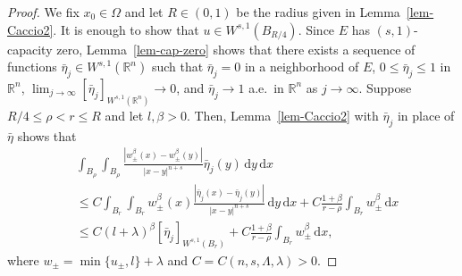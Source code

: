 \documentclass{amsart}
\theoremstyle{plain}
\theoremstyle{definition}
\numberwithin{equation}{section}
\begin{document}
\begin{proof}
We fix $x_0 \in \Omega$ and let $R \in (0,1)$ be the radius given in Lemma~\ref{lem-Caccio2}. It is enough to show that $u \in W^{s, 1}(B_{R/4})$. Since $E$ has $(s, 1)$-capacity zero, Lemma~\ref{lem-cap-zero} shows that there exists a sequence of functions $\bar{\eta}_j \in W^{s, 1}(\mathbb{R}^n)$ such that $\bar{\eta}_j=0$ in a neighborhood of $E$, $0 \leq \bar{\eta}_j \leq 1$ in $\mathbb{R}^n$, $\lim_{j\to \infty} [\bar{\eta}_j]_{W^{s,1}(\mathbb{R}^n)} \to 0$, and $\bar{\eta}_j \to 1$ a.e.\ in $\mathbb{R}^n$ as $j \to \infty$. Suppose $R/4\leq \rho<r\leq R$ and let $l, \beta>0$. Then, Lemma~\ref{lem-Caccio2} with $\bar{\eta}_j$ in place of $\bar{\eta}$ shows that
\begin{equation*}
\begin{split}
&\int_{B_\rho} \int_{B_\rho} \frac{|w_\pm^\beta(x)-w_\pm^\beta(y)|}{|x-y|^{n+s}} \bar{\eta}_j(y) \,\mathrm{d}y \,\mathrm{d}x \\
&\leq C \int_{B_r} \int_{B_r} w_\pm^\beta(x) \frac{|\bar{\eta}_j(x)-\bar{\eta}_j(y)|}{|x-y|^{n+s}} \,\mathrm{d}y\,\mathrm{d}x + C\frac{1+\beta}{r-\rho} \int_{B_r} w_\pm^\beta \,\mathrm{d}x \\
&\leq C (l+\lambda)^\beta [\bar{\eta}_j]_{W^{s, 1}(B_r)} + C \frac{1+\beta}{r-\rho} \int_{B_r} w_\pm^\beta \,\mathrm{d}x,
\end{split}
\end{equation*}
where $w_\pm=\min\{u_\pm, l\} + \lambda$ and $C=C(n, s, \Lambda, \lambda)>0$.


\end{proof}
\end{document}
